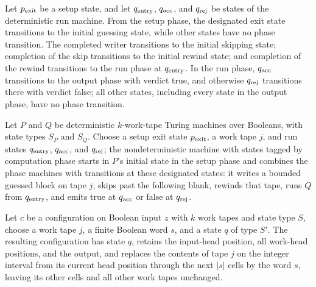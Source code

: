 \begin{definition}
\label{Turing.guessRunRed}
\leanok
{}
Let $p_{\rm exit}$ be a setup state, and let $q_{\rm entry}$, $q_{\rm acc}$, and $q_{\rm
rej}$ be states of the deterministic run machine. From the setup phase, the designated
exit state transitions to the initial guessing state, while other states have no phase
transition. The completed writer transitions to the initial skipping state; completion
of the skip transitions to the initial rewind state; and completion of the rewind
transitions to the run phase at $q_{\rm entry}$. In the run phase, $q_{\rm acc}$
transitions to the output phase with verdict true, and otherwise $q_{\rm rej}$
transitions there with verdict false; all other states, including every state in the
output phase, have no phase transition.
\end{definition}

\begin{definition}
\label{Turing.guessRunTM}
\leanok
{}
Let $P$ and $Q$ be deterministic $k$-work-tape Turing machines over Booleans, with state
types $S_P$ and $S_Q$. Choose a setup exit state $p_{\rm exit}$, a work tape $j$, and run
states $q_{\rm entry}$, $q_{\rm acc}$, and $q_{\rm rej}$; the nondeterministic machine with
states tagged by computation phase starts in $P$'s initial state in the setup phase and
combines the phase machines with transitions at these designated states: it writes a
bounded guessed block on tape $j$, skips past the following blank, rewinds that tape,
runs $Q$ from $q_{\rm entry}$, and emits true at $q_{\rm acc}$ or false at $q_{\rm rej}$.
\end{definition}

\begin{definition}
\label{Turing.guessRunCfg}
\leanok
{}
Let $c$ be a configuration on Boolean input $z$ with $k$ work tapes and state type $S$,
choose a work tape $j$, a finite Boolean word $s$, and a state $q$ of type $S'$. The
resulting configuration has state $q$, retains the input-head position, all work-head
positions, and the output, and replaces the contents of tape $j$ on the integer interval
from its current head position through the next $|s|$ cells by the word $s$, leaving its
other cells and all other work tapes unchanged.
\end{definition}

